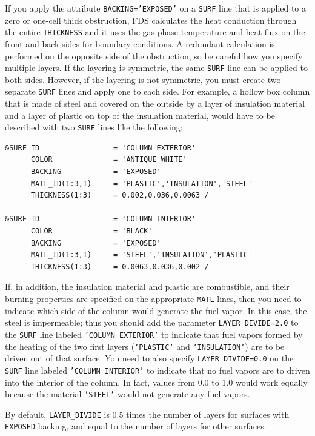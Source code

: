 \documentclass[11pt]{book}
\newcommand{\ct}{\tt\small}
\begin{document}
If you apply the attribute {\ct BACKING='EXPOSED'} on a {\ct SURF} line that is applied to a zero or one-cell thick
obstruction, FDS calculates the heat conduction through the entire {\ct THICKNESS} and it uses the gas phase temperature
and heat flux on the front and back sides for boundary conditions. A redundant calculation is performed on the opposite side of the obstruction, so be
careful how you specify multiple layers. If the layering is symmetric, the same {\ct SURF} line can be applied to both sides. However,
if the layering is not symmetric, you must create two separate {\ct SURF} lines and apply one to each side. For example, a hollow box column that is
made of steel and covered on the outside by a layer of insulation material and a layer of plastic on top of the insulation material,
would have to be described with two {\ct SURF} lines like the following:

\footnotesize
\begin{verbatim}
&SURF ID                 = 'COLUMN EXTERIOR'
      COLOR              = 'ANTIQUE WHITE'
      BACKING            = 'EXPOSED'
      MATL_ID(1:3,1)     = 'PLASTIC','INSULATION','STEEL'
      THICKNESS(1:3)     = 0.002,0.036,0.0063 /

&SURF ID                 = 'COLUMN INTERIOR'
      COLOR              = 'BLACK'
      BACKING            = 'EXPOSED'
      MATL_ID(1:3,1)     = 'STEEL','INSULATION','PLASTIC'
      THICKNESS(1:3)     = 0.0063,0.036,0.002 /
\end{verbatim} \normalsize

\noindent
If, in addition, the insulation material and plastic are combustible, and their burning properties are specified on the appropriate {\ct MATL} lines,
then you need to indicate which side of the column would generate the fuel vapor. In this case, the steel is impermeable; thus you should add the parameter
{\ct LAYER\_DIVIDE=2.0} to the {\ct SURF} line labeled {\ct 'COLUMN EXTERIOR'} to indicate that fuel vapors formed by the heating of the
two first layers ({\ct 'PLASTIC'} and {\ct 'INSULATION'}) are to be driven out of that surface.
You need to also specify {\ct LAYER\_DIVIDE=0.0} on the {\ct SURF} line labeled {\ct 'COLUMN INTERIOR'} to indicate that no fuel
vapors are to driven into the interior of the column. In fact, values from 0.0 to 1.0 would work equally because the material
{\ct 'STEEL'} would not generate any fuel vapors.

By default, {\ct LAYER\_DIVIDE} is 0.5 times the number of layers for surfaces with {\ct EXPOSED} backing, and equal to the number of
layers for other surfaces.
\end{document}
